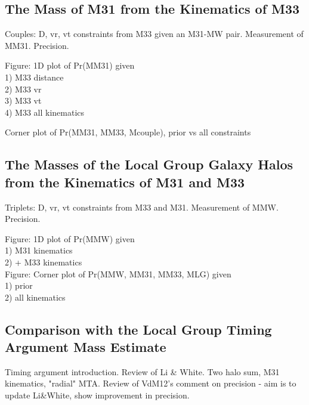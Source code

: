 \documentclass[iop,apj]{emulateapj}
\begin{document}

\subsection{The Mass of M31 from the Kinematics of M33}
\label{sec:results:M31mass}

Couples: D, vr, vt constraints from M33 given an M31-MW pair. 
Measurement of  MM31. Precision. 

Figure: 1D plot of Pr(MM31) given \\
  1) M33 distance\\
  2) M33 vr\\
  3) M33 vt\\
  4) M33 all kinematics

Corner plot of Pr(MM31, MM33, Mcouple), prior vs all constraints


\subsection{The Masses of the Local Group Galaxy Halos from the Kinematics of M31 and M33}
\label{sec:results:jointanalysis}

Triplets: D, vr, vt constraints from M33 and M31. 
Measurement of MMW. Precision. 

Figure: 1D plot of Pr(MMW) given \\
  1) M31 kinematics\\
  2) + M33 kinematics\\

Figure: Corner plot of Pr(MMW, MM31, MM33, MLG) given\\
   1) prior \\
   2) all kinematics \\


\subsection{Comparison with the Local Group Timing Argument Mass Estimate}
\label{sec:results:TA}

Timing argument introduction. Review of Li \& White. Two halo sum, M31
kinematics, "radial" MTA. Review of VdM12's comment on precision - aim is to
update Li\&White, show improvement in precision.  
\end{document}
